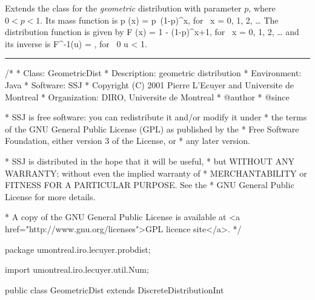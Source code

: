 
Extends the class  for
the {\em geometric\/} distribution
\cite[page 322]{sLAW00a} with parameter
$p$, where $0 < p < 1$.
Its mass function is
\eq
 p (x) = p\, (1-p)^x, \qquad \mbox{for } x = 0, 1, 2, \ldots
\endeq
The distribution function is given by
\eq
   F (x) = 1 - (1-p)^{x+1}, \qquad \mbox{for } x = 0, 1, 2, \ldots
\endeq
and its inverse is
\eq
   F^{-1}(u) = \left\lfloor {}
                \right\rfloor,
               \qquad \mbox{for }  0 \le u < 1.
\endeq


\bigskip\hrule

\begin{code}
\begin{hide}
/*
 * Class:        GeometricDist
 * Description:  geometric distribution
 * Environment:  Java
 * Software:     SSJ
 * Copyright (C) 2001  Pierre L'Ecuyer and Universite de Montreal
 * Organization: DIRO, Universite de Montreal
 * @author
 * @since

 * SSJ is free software: you can redistribute it and/or modify it under
 * the terms of the GNU General Public License (GPL) as published by the
 * Free Software Foundation, either version 3 of the License, or
 * any later version.

 * SSJ is distributed in the hope that it will be useful,
 * but WITHOUT ANY WARRANTY; without even the implied warranty of
 * MERCHANTABILITY or FITNESS FOR A PARTICULAR PURPOSE.  See the
 * GNU General Public License for more details.

 * A copy of the GNU General Public License is available at
   <a href="http://www.gnu.org/licenses">GPL licence site</a>.
 */
\end{hide}
package umontreal.iro.lecuyer.probdist;
\begin{hide}
import  umontreal.iro.lecuyer.util.Num;\end{hide}

public class GeometricDist extends DiscreteDistributionInt\begin{hide} {

   private double p;
   private double vp;
\end{hide}\end{code}

